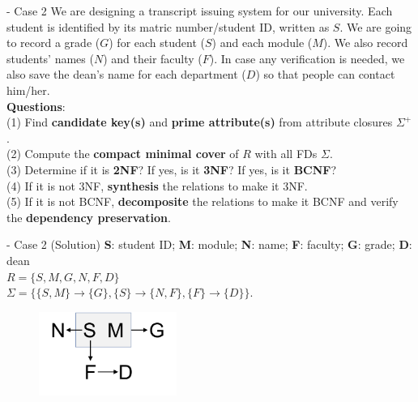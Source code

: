 \begin{frame}[fragile]{ - Case 2}
	We are designing a transcript issuing system for our university. 
	Each student is identified by its matric number/student ID, written as $S$.
	We are going to record a grade ($G$) for each student ($S$) and each module ($M$).
	We also record students' names ($N$) and their faculty ($F$). In case any verification is needed, we also save the dean's name for each department ($D$) so that people can contact him/her.\\\vspace{10pt}
	\textbf{Questions}:\\
	(1) Find \textbf{candidate key(s)} and \textbf{prime attribute(s)} from attribute closures $\Sigma^{+}$.\\
	(2) Compute the \textbf{compact minimal cover} of $R$ with all FDs $\Sigma$.\\
	(3) Determine if it is \textbf{2NF}? If yes, is it \textbf{3NF}? If yes, is it \textbf{BCNF}?\\
	(4) If it is not 3NF, \textbf{synthesis} the relations to make it 3NF.\\
	(5) If it is not BCNF, \textbf{decomposite} the relations to make it BCNF and verify the \textbf{dependency preservation}. 
\end{frame}

\begin{frame}[fragile]{ - Case 2 (Solution)}
	\textbf{S}: student ID; \textbf{M}: module; \textbf{N}: name;
	\textbf{F}: faculty; \textbf{G}: grade; \textbf{D}: dean\\\vspace{5pt}
	$R = \{S, M, G, N, F, D\}$\\
	$\Sigma = \{\{S, M\} \rightarrow \{G\}, 
	\{S\} \rightarrow \{N, F\},
	\{F\} \rightarrow \{D\}\}$.\\\vspace{15pt}
	\begin{figure}
		\includegraphics[width=0.4\textwidth, trim=0 0 0 0, clip]{t5/images/case2.png}
	\end{figure}\vspace{-5pt}
\end{frame}

